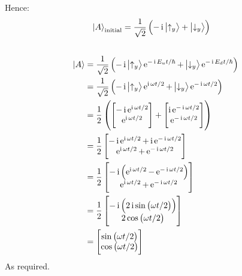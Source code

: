 Hence:
\begin{align*}
    \ket{A}_{\textrm{initial}} & = \frac{1}{\sqrt{2}} \del{-\operatorname{i} \ket{\uparrow_y} + \ket{\downarrow_y}}
\end{align*}

\subsection{}
\begin{align*}
    \ket{A} & = \frac{1}{\sqrt{2}} \del{-\operatorname{i} \ket{\uparrow_y} \operatorname{e}^{-\operatorname{i}E_u t/\hbar} + \ket{\downarrow_y} \operatorname{e}^{-\operatorname{i}E_d t/\hbar}}\\
    & = \frac{1}{\sqrt{2}} \del{-\operatorname{i} \ket{\uparrow_y} \operatorname{e}^{\operatorname{i} \omega t/2} + \ket{\downarrow_y} \operatorname{e}^{-\operatorname{i} \omega t/2}}\\
    & = \frac{1}{2} \del{
        \begin{bmatrix}
            -\operatorname{i} \operatorname{e}^{\operatorname{i} \omega t/2}\\
            \operatorname{e}^{\operatorname{i} \omega t/2}
        \end{bmatrix}
        +
        \begin{bmatrix}
            \operatorname{i} \operatorname{e}^{-\operatorname{i} \omega t/2}\\
            \operatorname{e}^{-\operatorname{i} \omega t/2}
        \end{bmatrix}
    }\\
    & = \frac{1}{2}
    \begin{bmatrix}
        -\operatorname{i} \operatorname{e}^{\operatorname{i} \omega t/2} + \operatorname{i} \operatorname{e}^{-\operatorname{i} \omega t/2}\\
        \operatorname{e}^{\operatorname{i} \omega t/2} + \operatorname{e}^{-\operatorname{i} \omega t/2}
    \end{bmatrix}\\
    & = \frac{1}{2}
    \begin{bmatrix}
        -\operatorname{i} \del{\operatorname{e}^{\operatorname{i} \omega t/2} - \operatorname{e}^{-\operatorname{i} \omega t/2}}\\
        \operatorname{e}^{\operatorname{i} \omega t/2} + \operatorname{e}^{-\operatorname{i} \omega t/2}
    \end{bmatrix}
    \\
    & = \frac{1}{2}
    \begin{bmatrix}
        -\operatorname{i} \del{2 \operatorname{i} \sin{\del{\omega t / 2}}}\\
        2 \cos{\del{\omega t / 2}}
    \end{bmatrix}
    \\
    & =
    \begin{bmatrix}
        \sin{\del{\omega t / 2}}\\
        \cos{\del{\omega t / 2}}
    \end{bmatrix}
\end{align*}
As required.

